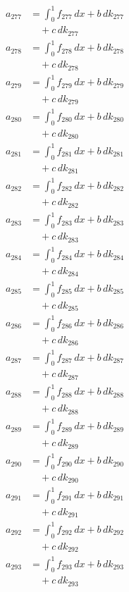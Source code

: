\documentclass{article}
\begin{document}
\begin{align}
a_{277} &= \int_0^1 f_{277}\,dx + b\,dk_{277} \\
&\quad + c\,dk_{277} \\
a_{278} &= \int_0^1 f_{278}\,dx + b\,dk_{278} \\
&\quad + c\,dk_{278} \\
a_{279} &= \int_0^1 f_{279}\,dx + b\,dk_{279} \\
&\quad + c\,dk_{279} \\
a_{280} &= \int_0^1 f_{280}\,dx + b\,dk_{280} \\
&\quad + c\,dk_{280} \\
a_{281} &= \int_0^1 f_{281}\,dx + b\,dk_{281} \\
&\quad + c\,dk_{281} \\
a_{282} &= \int_0^1 f_{282}\,dx + b\,dk_{282} \\
&\quad + c\,dk_{282} \\
a_{283} &= \int_0^1 f_{283}\,dx + b\,dk_{283} \\
&\quad + c\,dk_{283} \\
a_{284} &= \int_0^1 f_{284}\,dx + b\,dk_{284} \\
&\quad + c\,dk_{284} \\
a_{285} &= \int_0^1 f_{285}\,dx + b\,dk_{285} \\
&\quad + c\,dk_{285} \\
a_{286} &= \int_0^1 f_{286}\,dx + b\,dk_{286} \\
&\quad + c\,dk_{286} \\
a_{287} &= \int_0^1 f_{287}\,dx + b\,dk_{287} \\
&\quad + c\,dk_{287} \\
a_{288} &= \int_0^1 f_{288}\,dx + b\,dk_{288} \\
&\quad + c\,dk_{288} \\
a_{289} &= \int_0^1 f_{289}\,dx + b\,dk_{289} \\
&\quad + c\,dk_{289} \\
a_{290} &= \int_0^1 f_{290}\,dx + b\,dk_{290} \\
&\quad + c\,dk_{290} \\
a_{291} &= \int_0^1 f_{291}\,dx + b\,dk_{291} \\
&\quad + c\,dk_{291} \\
a_{292} &= \int_0^1 f_{292}\,dx + b\,dk_{292} \\
&\quad + c\,dk_{292} \\
a_{293} &= \int_0^1 f_{293}\,dx + b\,dk_{293} \\
&\quad + c\,dk_{293} \\

\end{align}
\end{document}
